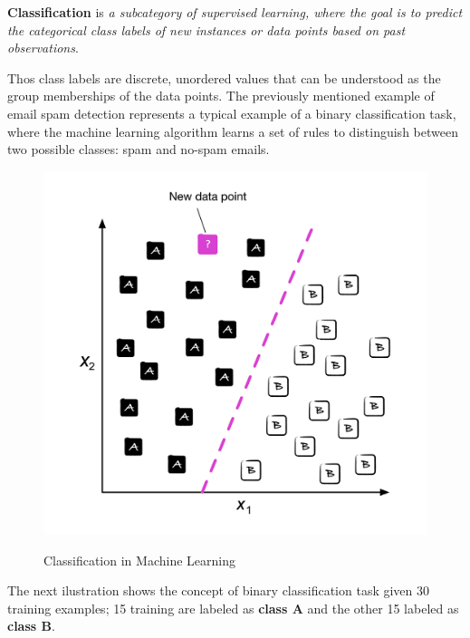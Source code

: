 \documentclass[../machine_learning_scikit.tex]{subfiles}
\begin{document}
    \begin{mydef}
        \textbf{Classification} is \textit{a subcategory of supervised learning, where the goal is to predict the categorical class labels of new instances or data points based on past observations}.
    \end{mydef}

    Thos class labels are discrete, unordered values that can be understood as the group memberships of the data points. The previously mentioned example of email spam detection represents a typical example of a binary classification task, where the machine learning algorithm learns a set of rules to distinguish between two possible classes: spam and no-spam emails.

    \begin{figure}[h]
        \begin{minipage}{\textwidth}
            \centering
            \includegraphics[scale=1]{images/classification_ml} \\
            \caption{Classification in Machine Learning}
            \label{figure:classification_ml}
        \end{minipage}
    \end{figure}

    The next ilustration shows the concept of binary classification task given 30 training examples; 15 training are labeled as \textbf{class A} and the other 15 labeled as \textbf{class B}.
\end{document}
